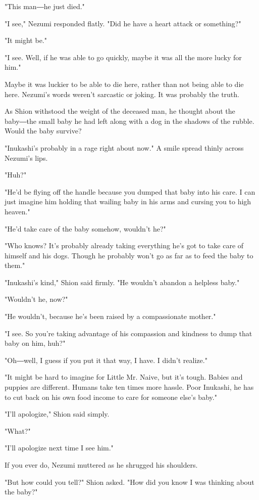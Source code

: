 "This man―he just died."

"I see," Nezumi responded flatly. "Did he have a heart attack or
something?"

"It might be."

"I see. Well, if he was able to go quickly, maybe it was all the more
lucky for him."

Maybe it was luckier to be able to die here, rather than not being able
to die here. Nezumi's words weren't sarcastic or joking. It was probably
the truth.

As Shion withstood the weight of the deceased man, he thought about the
baby―the small baby he had left along with a dog in the shadows of the
rubble. Would the baby survive?

"Inukashi's probably in a rage right about now." A smile spread thinly
across Nezumi's lips.

"Huh?"

"He'd be flying off the handle because you dumped that baby into his
care. I can just imagine him holding that wailing baby in his arms and
cursing you to high heaven."

"He'd take care of the baby somehow, wouldn't he?"

"Who knows? It's probably already taking everything he's got to take
care of himself and his dogs. Though he probably won't go as far as to
feed the baby to them."

"Inukashi's kind," Shion said firmly. "He wouldn't abandon a helpless
baby."

"Wouldn't he, now?"

"He wouldn't, because he's been raised by a compassionate mother."

"I see. So you're taking advantage of his compassion and kindness to
dump that baby on him, huh?"

"Oh―well, I guess if you put it that way, I have. I didn't realize."

"It might be hard to imagine for Little Mr. Naive, but it's tough.
Babies and puppies are different. Humans take ten times more hassle.
Poor Inukashi, he has to cut back on his own food income to care for
someone else's baby."

"I'll apologize," Shion said simply.

"What?"

"I'll apologize next time I see him."

If you ever do, Nezumi muttered as he shrugged his shoulders.

"But how could you tell?" Shion asked. "How did you know I was thinking
about the baby?"

